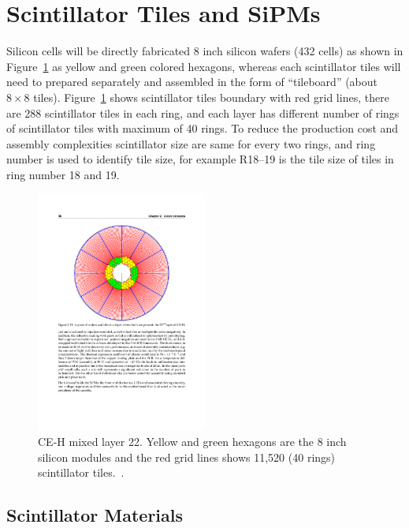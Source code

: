 \clearpage
\section{
  Scintillator Tiles and SiPMs
 }

Silicon cells will be directly fabricated 8 inch silicon wafers (432
cells) as shown
in Figure~\ref{fig:hgcal-layer-22} as yellow and green colored hexagons,
whereas each scintillator tiles will need to prepared separately
and assembled in the form of ``tileboard'' (about \(8\times 8\) tiles).
Figure~\ref{fig:hgcal-layer-22} shows scintillator
tiles boundary with red grid lines, there are 288
scintillator tiles in
each ring, and each layer has different
number of rings of scintillator tiles with maximum of 40 rings. To reduce
the production cost and assembly complexities scintillator size are
same for every two rings, and ring number is used to identify tile
size, for example R18--19 is the tile size of tiles in ring number 18 and 19.

\begin{figure}[!ht]
  \centering
  \includegraphics[trim={129 389 127 113},clip,width=0.5\textwidth]{figures/hgcal/page36_TDR_HGCAL.pdf}
  \caption[CE-H mixed layer 22]
  {CE-H mixed layer 22. Yellow and green hexagons are the
    8 inch silicon modules and the red grid lines shows
    11,520 (40 rings) scintillator tiles.~\cite{cms-hgcal-tdr}.}%
  \label{fig:hgcal-layer-22}
\end{figure}

\subsection{
  Scintillator Materials
}

